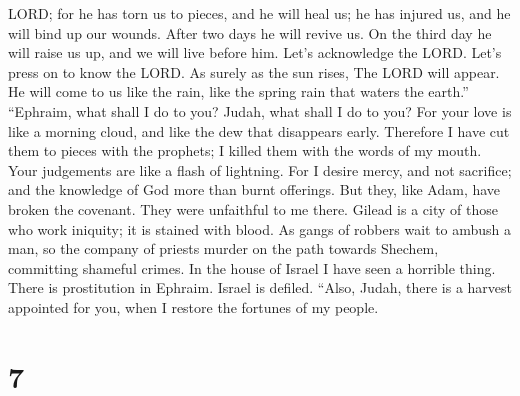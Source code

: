 LORD; for he has torn us to pieces, and he will heal us; he has injured
us, and he will bind up our wounds.  After two days he will
revive us. On the third day he will raise us up, and we will live before
him.  Let's acknowledge the LORD. Let's press on to know the
LORD. As surely as the sun rises, The LORD will appear. He will come to
us like the rain, like the spring rain that waters the earth.''
 ``Ephraim, what shall I do to you? Judah, what shall I do
to you? For your love is like a morning cloud, and like the dew that
disappears early.  Therefore I have cut them to pieces with
the prophets; I killed them with the words of my mouth. Your judgements
are like a flash of lightning.  For I desire mercy, and not
sacrifice; and the knowledge of God more than burnt offerings.
 But they, like Adam, have broken the covenant. They were
unfaithful to me there.  Gilead is a city of those who work
iniquity; it is stained with blood.  As gangs of robbers
wait to ambush a man, so the company of priests murder on the path
towards Shechem, committing shameful crimes.  In the house
of Israel I have seen a horrible thing. There is prostitution in
Ephraim. Israel is defiled.  ``Also, Judah, there is a
harvest appointed for you, when I restore the fortunes of my people.

\hypertarget{section-4}{%
\section{7}\label{section-4}}


